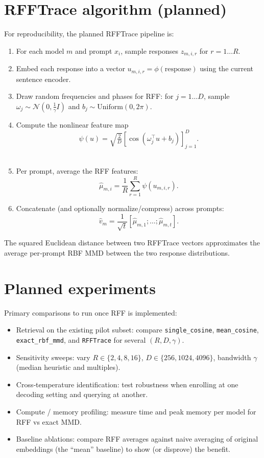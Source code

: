 \documentclass[11pt,a4paper]{article}
\begin{document}
\section{RFFTrace algorithm (planned)}
For reproducibility, the planned RFFTrace pipeline is:
\begin{enumerate}
  \item For each model \(m\) and prompt \(x_i\), sample responses \(z_{m,i,r}\) for \(r=1\ldots R\).
  \item Embed each response into a vector \(u_{m,i,r}=\phi(\text{response})\) using the current sentence encoder.
  \item Draw random frequencies and phases for RFF: for $j=1\ldots D$, sample $\omega_j\sim\mathcal{N}(0,\frac{1}{\gamma}I)$ and $b_j\sim\text{Uniform}(0,2\pi)$.
  \item Compute the nonlinear feature map
  $$\psi(u)=\sqrt{\tfrac{2}{D}}\left[\cos(\omega_j^\top u + b_j)\right]_{j=1}^D.$$\\
  \item Per prompt, average the RFF features:
  $$\widehat{\mu}_{m,i}=\frac{1}{R}\sum_{r=1}^R \psi(u_{m,i,r}).$$
  \item Concatenate (and optionally normalize/compress) across prompts:
  $$\widehat v_m=\frac{1}{\sqrt t}[\widehat{\mu}_{m,1};\ldots;\widehat{\mu}_{m,t}].$$
\end{enumerate}

The squared Euclidean distance between two RFFTrace vectors approximates the
average per‑prompt RBF MMD between the two response distributions.

\section{Planned experiments}
Primary comparisons to run once RFF is implemented:
\begin{itemize}
  \item Retrieval on the existing pilot subset: compare \texttt{single\_cosine}, \texttt{mean\_cosine}, \texttt{exact\_rbf\_mmd}, and \texttt{RFFTrace} for several $(R,D,\gamma)$.
  \item Sensitivity sweeps: vary $R\in\{2,4,8,16\}$, $D\in\{256,1024,4096\}$, bandwidth $\gamma$ (median heuristic and multiples).
  \item Cross‑temperature identification: test robustness when enrolling at one decoding setting and querying at another.
  \item Compute / memory profiling: measure time and peak memory per model for RFF vs exact MMD.
  \item Baseline ablations: compare RFF averages against naive averaging of original embeddings (the ``mean'' baseline) to show (or disprove) the benefit.
\end{itemize}
\end{document}

